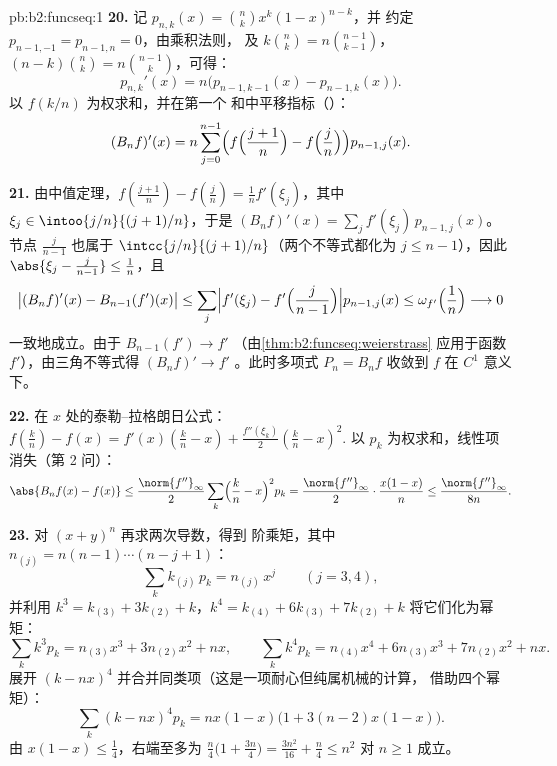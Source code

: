 \begin{solution}{pb:b2:funcseq:1}
\textbf{20.} 记 $p_{n,k}(x) = \binom nk x^k(1-x)^{n-k}$，并
约定 $p_{n-1,-1} = p_{n-1,n} = 0$，由乘积法则，
及 $k\binom nk = n\binom{n-1}{k-1}$，$(n-k)\binom nk =
n\binom{n-1}{k}$，可得：
\[
p_{n,k}'(x) = n\bigl(p_{n-1,k-1}(x) - p_{n-1,k}(x)\bigr) .
\]
以 $f(k/n)$ 为权求和，并在第一个
和中平移指标（）：
\[
(B_nf)'(x) = n\sum_{j=0}^{n-1}\Bigl(f\Bigl(\frac{j+1}n\Bigr)
- f\Bigl(\frac jn\Bigr)\Bigr)p_{n-1,j}(x) .
\]

\textbf{21.} 由中值定理，$f(\frac{j+1}n) -
f(\frac jn) = \frac1n f'(\xi_j)$，其中 $\xi_j \in
\intoo{j/n}{(j+1)/n}$，于是 $(B_nf)'(x) = \sum_j
f'(\xi_j)\,p_{n-1,j}(x)$。节点 $\frac{j}{n-1}$ 也属于
$\intcc{j/n}{(j+1)/n}$（两个不等式都化为 $j \leq
n-1$），因此 $\abs{\xi_j - \frac j{n-1}} \leq \frac1n$，且
\[
\bigl|(B_nf)'(x) - B_{n-1}(f')(x)\bigr|
\leq \sum_j\Bigl|f'(\xi_j) -
f'\Bigl(\frac{j}{n-1}\Bigr)\Bigr| p_{n-1,j}(x)
\leq \omega_{f'}\Bigl(\frac1n\Bigr) \longrightarrow 0
\]
一致地成立。由于 $B_{n-1}(f') \to f'$ 
（由\cref{thm:b2:funcseq:weierstrass} 应用于函数
$f'$），由三角不等式得 $(B_nf)' \to f'$
。此时多项式 $P_n = B_nf$ 收敛到 $f$
在 $C^1$ 意义下。

\textbf{22.} 在 $x$ 处的泰勒--拉格朗日公式：$f(\frac kn) - f(x) =
f'(x)(\frac kn - x) + \frac{f''(\xi_k)}2(\frac kn - x)^2$.
以 $p_k$ 为权求和，线性项消失（第 2 问）：
\[
\abs{B_nf(x) - f(x)}
\leq \frac{\norm{f''}_\infty}{2}\sum_k\Bigl(\frac kn -
x\Bigr)^2p_k
= \frac{\norm{f''}_\infty}{2}\cdot\frac{x(1-x)}{n}
\leq \frac{\norm{f''}_\infty}{8n} .
\]

\textbf{23.} 对 $(x+y)^n$ 再求两次导数，得到
阶乘矩，其中 $n_{(j)} = n(n-1)\cdots(n-j+1)$：
\[
\sum_k k_{(j)}\,p_k = n_{(j)}\,x^j \qquad (j = 3, 4),
\]
并利用 $k^3 = k_{(3)} + 3k_{(2)} + k$，$k^4 = k_{(4)} + 6k_{(3)} +
7k_{(2)} + k$ 将它们化为幂矩：
\[
\sum_k k^3p_k = n_{(3)}x^3 + 3n_{(2)}x^2 + nx,
\qquad
\sum_k k^4p_k = n_{(4)}x^4 + 6n_{(3)}x^3 + 7n_{(2)}x^2 + nx .
\]
展开 $(k - nx)^4$ 并合并同类项（这是一项耐心但纯属机械的计算，
借助四个幂矩）：
\[
\sum_k(k-nx)^4p_k = nx(1-x)\bigl(1 + 3(n-2)x(1-x)\bigr) .
\]
由 $x(1-x) \leq \frac14$，右端至多为
$\frac n4\bigl(1 + \frac{3n}4\bigr) = \frac{3n^2}{16} +
\frac n4 \leq n^2$ 对 $n \geq 1$ 成立。


\end{solution}
